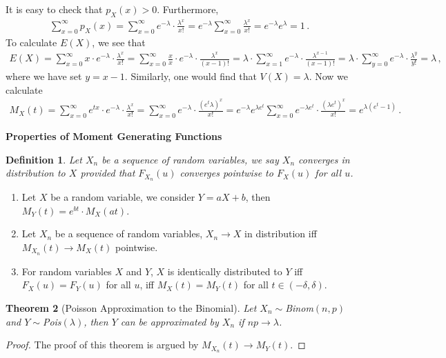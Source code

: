 \documentclass[11pt,oneside]{book}
\theoremstyle{newStyle}
\newtheorem{thm}{Theorem}[chapter]
\newtheorem{defn}[thm]{Definition}
\begin{document}
It is easy to check that $p_X(x)>0$. Furthermore, 
\begin{align*}
\sum_{x=0}^\infty p_X(x) = \sum_{x=0}^\infty e^{-\lambda}\cdot \frac{\lambda^x}{x!} = e^{-\lambda}\sum_{x=0}^\infty \frac{\lambda^x}{x!} = e^{-\lambda }e^{\lambda} = 1\,.
\end{align*}
To calculate $E(X)$, we see that 
\begin{align*}
E(X) = \sum_{x=0}^\infty x\cdot e^{-\lambda}\cdot \frac{\lambda^x}{x!} = \sum_{x=0}^\infty \frac{x}{x}\cdot e^{-\lambda}\cdot \frac{\lambda^x}{(x-1)!} = \lambda \cdot \sum_{x=1}^\infty e^{-\lambda}\cdot \frac{\lambda^{x-1}}{(x-1)!} =\lambda \cdot \sum_{y=0}^\infty e^{-\lambda}\cdot \frac{\lambda^y}{y!} =\lambda\,,
\end{align*}
where we have set $y=x-1$. Similarly, one would find that $V(X) = \lambda$. Now we calculate
\begin{align*}
M_X(t) = \sum_{x=0}^\infty e^{tx}\cdot e^{-\lambda}\cdot \frac{\lambda^x}{x!} = \sum_{x=0}^\infty e^{-\lambda}\cdot \frac{(e^t\lambda)^x}{x!} = e^{-\lambda}e^{\lambda e^t}\sum_{x=0}^\infty e^{-\lambda e^t}\cdot \frac{(\lambda e^t)^x}{x!} = e^{\lambda(e^t-1)}\,.
\end{align*}
\newpage

\textbf{Properties of Moment Generating Functions}\\
\begin{defn}
Let $X_n$ be a sequence of random variables, we say $X_n$ converges in distribution to $X$ provided that $F_{X_n}(u)$ converges pointwise to $F_X(u)$ for all $u$.
\end{defn}
\begin{enumerate}
\item Let $X$ be a random variable, we consider $Y = aX +b$, then 
$M_Y(t) = e^{bt} \cdot M_X(at)$. 
\item Let $X_n$ be a sequence of random variables, $X_n \to X$ in distribution iff $M_{X_n}(t) \to M_X(t)$ pointwise. 
\item For random variables $X$ and $Y$, $X$ is identically distributed to $Y$ iff $F_X(u) = F_Y(u)$ for all $u$, iff $M_X(t) = M_Y(t)$ for all $t \in (-\delta, \delta)$. 
\end{enumerate}


\begin{thm}[Poisson Approximation to the Binomial]
Let $X_n \sim $Binom$(n,p)$ and $Y\sim$Pois$(\lambda)$, then $Y$ can be approximated by $X_n$ if $np \to \lambda$.  
\end{thm}
\begin{proof}
The proof of this theorem is argued by $M_{X_n}(t) \to M_Y(t)$. 
\end{proof}
\end{document}
